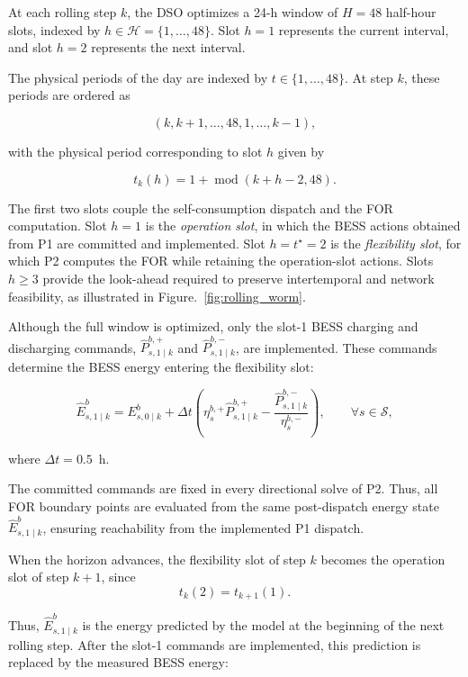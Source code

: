 \documentclass[journal]{IEEEtran}
\begin{document}
At each rolling step \(k\), the DSO optimizes a 24-h window of \(H=48\) half-hour slots, indexed by \(h\in\mathcal{H}=\{1,\ldots,48\}\). Slot \(h=1\) represents the current interval, and slot \(h=2\) represents the next interval.

The physical periods of the day are indexed by
\(t\in\{1,\ldots,48\}\). At step \(k\), these periods are ordered as

\[
(k,k+1,\ldots,48,1,\ldots,k-1),
\]

with the physical period corresponding to slot \(h\) given by

\begin{equation}
\label{eq:time_mapping}
t_k(h)=1+\operatorname{mod}(k+h-2,48).
\end{equation}

The first two slots couple the self-consumption dispatch and the FOR
computation. Slot \(h=1\) is the \emph{operation slot}, in which the BESS
actions obtained from P1 are committed and implemented. Slot
\(h=t^\star=2\) is the \emph{flexibility slot}, for which P2 computes the
FOR while retaining the operation-slot actions. Slots \(h\geq3\) provide
the look-ahead required to preserve intertemporal and network feasibility,
as illustrated in Figure.~\ref{fig:rolling_worm}.

Although the full window is optimized, only the slot-1 BESS charging and discharging commands, \(\widehat{P}^{b,+}_{s,1\mid k}\) and \(\widehat{P}^{b,-}_{s,1\mid k}\), are implemented. These commands determine the BESS energy entering the flexibility slot: 

\begin{equation} \label{eq:committed_state} \widehat{E}^{b}_{s,1\mid k} = E^{b}_{s,0\mid k} + \Delta t \left( \eta^{b,+}_{s}\widehat{P}^{b,+}_{s,1\mid k} - \frac{\widehat{P}^{b,-}_{s,1\mid k}} {\eta^{b,-}_{s}} \right), \qquad \forall s\in\mathcal{S}, 
\end{equation} 

where \(\Delta t=0.5\)~h. 

The committed commands are fixed in every directional solve of P2. Thus, all FOR boundary points are evaluated from the same post-dispatch energy state \(\widehat{E}^{b}_{s,1\mid k}\), ensuring reachability from the implemented P1 dispatch.

When the horizon advances, the flexibility slot of step \(k\) becomes the operation slot of step \(k+1\), since \[ t_k(2)=t_{k+1}(1). \] 

Thus, \(\widehat{E}^{b}_{s,1\mid k}\) is the energy predicted by the model at the beginning of the next rolling step. After the slot-1 commands are implemented, this prediction is replaced by the measured BESS energy: 
\end{document}
